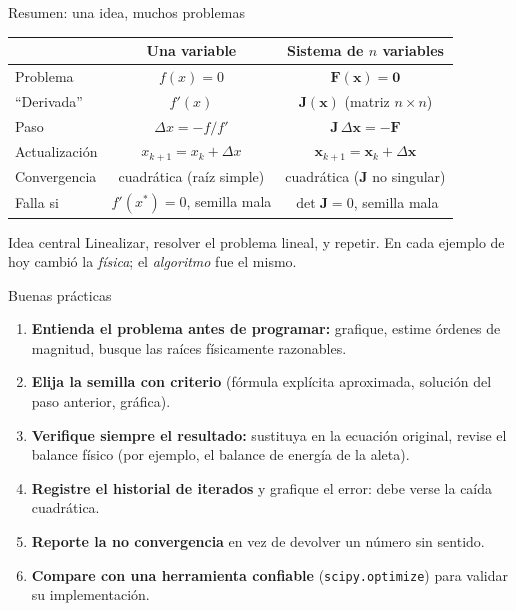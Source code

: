 \documentclass[aspectratio=169,11pt]{beamer}
\newcommand{\vect}[1]{\mathbf{#1}}
\newcommand{\Jac}{\mathbf{J}}
\begin{document}
\begin{frame}{Resumen: una idea, muchos problemas}
  \begin{center}
  \begin{tabular}{@{}lcc@{}}
    \toprule
     & \textbf{Una variable} & \textbf{Sistema de $n$ variables} \\
    \midrule
    Problema & $f(x)=0$ & $\vect F(\vect x)=\vect 0$ \\[0.8ex]
    ``Derivada'' & $f'(x)$ & $\Jac(\vect x)$ (matriz $n\times n$) \\[0.8ex]
    Paso & $\Delta x=-f/f'$ & $\Jac\,\Delta\vect x=-\vect F$ \\[0.8ex]
    Actualización & $x_{k+1}=x_k+\Delta x$ & $\vect x_{k+1}=\vect x_k+\Delta\vect x$ \\[0.8ex]
    Convergencia & cuadrática (raíz simple) & cuadrática ($\Jac$ no singular) \\[0.8ex]
    Falla si & $f'(x^*)=0$, semilla mala & $\det\Jac=0$, semilla mala \\
    \bottomrule
  \end{tabular}
  \end{center}
  \medskip
  \begin{block}{Idea central}
    Linealizar, resolver el problema lineal, y repetir. En cada ejemplo de hoy cambió la \emph{física}; el \emph{algoritmo} fue el mismo.
  \end{block}
\end{frame}

\begin{frame}{Buenas prácticas}
  \begin{enumerate}
    \item \textbf{Entienda el problema antes de programar:} grafique, estime órdenes de magnitud, busque las raíces físicamente razonables.
    \item \textbf{Elija la semilla con criterio} (fórmula explícita aproximada, solución del paso anterior, gráfica).
    \item \textbf{Verifique siempre el resultado:} sustituya en la ecuación original, revise el balance físico (por ejemplo, el balance de energía de la aleta).
    \item \textbf{Registre el historial de iterados} y grafique el error: debe verse la caída cuadrática.
    \item \textbf{Reporte la no convergencia} en vez de devolver un número sin sentido.
    \item \textbf{Compare con una herramienta confiable} (\texttt{scipy.optimize}) para validar su implementación.
  \end{enumerate}
\end{frame}
\end{document}
